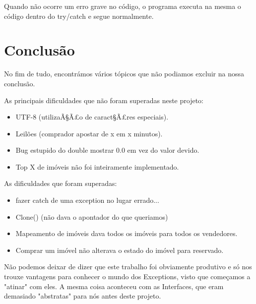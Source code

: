 \documentclass[12pt]{article}
\begin{document}
Quando não ocorre um erro grave no código, o programa executa na mesma o código dentro do try/catch e segue normalmente.  

\pagebreak

 
\section{Conclusão}

No fim de tudo, encontrámos vários tópicos que não podiamos excluir na nossa conclusão.

As principais dificuldades que não foram superadas neste projeto:
\begin{itemize}
\item UTF-8 (utilizaÃ§Ã£o de caract§Ã£res especiais).
\item Leilões (comprador apostar de x em x minutos).
\item Bug estupido do double mostrar 0.0 em vez do valor devido.
\item Top X de imóveis não foi inteiramente implementado.
\end{itemize}
As dificuldades que foram superadas:
\begin{itemize}
\item fazer catch de uma exception no lugar errado...
\item Clone() (não dava o apontador do que queriamos)
\item Mapeamento de imóveis dava todos os imóveis para todos os vendedores.
\item Comprar um imóvel não alterava o estado do imóvel para reservado.
\end{itemize}

Não podemos deixar de dizer que este trabalho foi obviamente produtivo e só nos trouxe vantagens para conhecer o mundo dos Exceptions, visto que começamos a "atinar" com eles. A mesma coisa aconteceu com as Interfaces, que eram demasiado "abstratas" para nós antes deste projeto.
\end{document}
